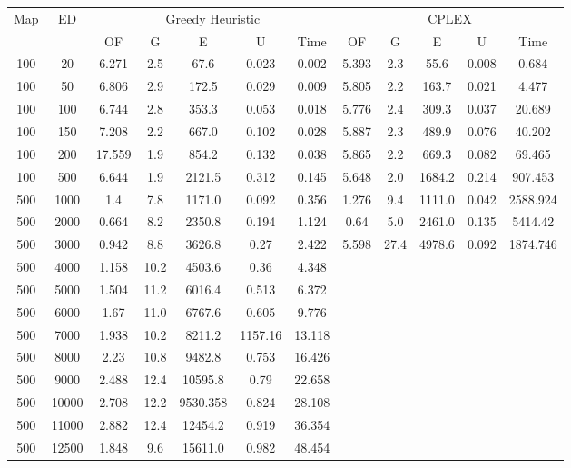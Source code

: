 \begin{table}[htb]
	\centering
	\begin{tabular}{|c|c|c|c|c|c|c|c|c|c|c|c|}
		\hline
		\multirow{2}{*}{Map} & \multirow{2}{*}{ED} & \multicolumn{5}{c|}{Greedy Heuristic} & \multicolumn{5}{c|}{CPLEX}\\ 
		\cline{3-12}
&& OF & G & E & U & Time & OF & G & E & U & Time\\ 
		\hline
		100 & 20 & 6.271 & 2.5 & 67.6 & 0.023 & 0.002 & 5.393 & 2.3 & 55.6 & 0.008 & 0.684 \\ 
		100 & 50 & 6.806 & 2.9 & 172.5 & 0.029 & 0.009 & 5.805 & 2.2 & 163.7 & 0.021 & 4.477 \\ 
		100 & 100 & 6.744 & 2.8 & 353.3 & 0.053 & 0.018 & 5.776 & 2.4 & 309.3 & 0.037 & 20.689 \\ 
		100 & 150 & 7.208 & 2.2 & 667.0 & 0.102 & 0.028 & 5.887 & 2.3 & 489.9 & 0.076 & 40.202 \\ 
		100 & 200 & 17.559 & 1.9 & 854.2 & 0.132 & 0.038 & 5.865 & 2.2 & 669.3 & 0.082 & 69.465 \\ 
		100 & 500 & 6.644 & 1.9 & 2121.5 & 0.312 & 0.145 & 5.648 & 2.0 & 1684.2 & 0.214 & 907.453 \\ 
		500 & 1000 & 1.4 & 7.8 & 1171.0 & 0.092 & 0.356 & 1.276 & 9.4 & 1111.0 & 0.042 & 2588.924 \\ 
		500 & 2000 & 0.664 & 8.2 & 2350.8 & 0.194 & 1.124 & 0.64 & 5.0 & 2461.0 & 0.135 & 5414.42 \\ 
		500 & 3000 & 0.942 & 8.8 & 3626.8 & 0.27 & 2.422 & 5.598 & 27.4 & 4978.6 & 0.092 & 1874.746 \\ 
		500 & 4000 & 1.158 & 10.2 & 4503.6 & 0.36 & 4.348 & & & & &  \\ 
		500 & 5000 & 1.504 & 11.2 & 6016.4 & 0.513 & 6.372 & & & & &  \\ 
		500 & 6000 & 1.67 & 11.0 & 6767.6 & 0.605 & 9.776 & & & & &  \\ 
		500 & 7000 & 1.938 & 10.2 & 8211.2 & 1157.16 & 13.118 & & & & &  \\ 
		500 & 8000 & 2.23 & 10.8 & 9482.8 & 0.753 & 16.426 & & & & &  \\ 
		500 & 9000 & 2.488 & 12.4 & 10595.8 & 0.79 & 22.658 & & & & &  \\ 
		500 & 10000 & 2.708 & 12.2 & 9530.358 & 0.824 & 28.108 & & & & &  \\ 
		500 & 11000 & 2.882 & 12.4 & 12454.2 & 0.919 & 36.354 & & & & &  \\ 
		500 & 12500 & 1.848 & 9.6 & 15611.0 & 0.982 & 48.454 & & & & &  \\ 

\end{tabular}
\end{table}
